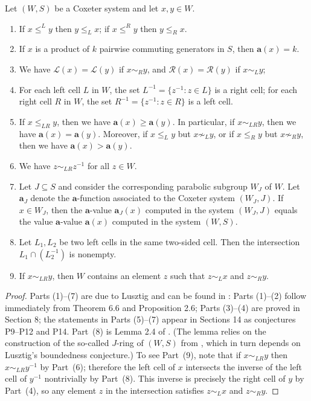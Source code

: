 \documentclass[ALCO,Unicode,published]{cedram}
\newcommand{\call}{\mathcal{L}}
\newcommand{\calr}{\mathcal{R}}
\newcommand{\la}{\mathbf{a}}
\newcommand{\se}{\subseteq}
\newcommand{\inverse}{^{-1}}
\begin{document}
\begin{prop}
     \label{prop:Facts}
     Let $(W,S)$ be a Coxeter system and let $x,y\in W$.
     \begin{enumerate}
         \item If $x\le^L y$ then $y\le_L x$; if $x\le^R y $ then $y\le_R x$.
         \item If $x$ is a product of $k$ pairwise commuting generators in $S$, then $\la(x)=k$.
         \item We have $\call(x)=\call(y)$ if $x\sim_R y$, and $\calr(x)=\calr(y)$ if $x\sim_L y$;
         \item For each left cell $L$ in $W$, the set $L\inverse=\{z\inverse: z\in L\}$ is a right cell; for each
             right cell $R$ in $W$, the set $R\inverse=\{z\inverse:z\in R\}$ is a left cell. 
         \item If $x\le_{LR} y$, then we have $\la(x)\ge \la(y)$. In particular, if $x\sim_{LR}y$, then
             we have $\la(x)=\la(y)$. Moreover, if $x\le_L y$ but $x\not\sim_L y$, or if $x\le_R y$ but
             $x\not\sim_R y$, then we have $\la(x)>\la(y)$.
         \item We have $z\sim_{LR} z\inverse$ for all $z\in W$.
         \item Let $J\se S$ and consider the corresponding parabolic subgroup $W_J$ of $W$.
             Let $\la_J$ denote the $\la$-function associated to the Coxeter system $(W_J,J)$. If 
             $x\in W_J$, then
             the $\la$-value $\la_J(x)$ computed in the system $(W_J, J)$ equals the value
             $\la$-value $\la(x)$ computed in the system $(W,S)$.
         \item Let $L_1,L_2$ be two left cells in the same two-sided
             cell. Then the intersection $L_1\cap (L_2\inverse)$ is
             nonempty.
         \item If $x\sim_{LR}y$, then $W$ contains an element $z$ such that $z\sim_L x$ and $z\sim_R y$. 
     \end{enumerate}
        \end{prop}
        \begin{proof}
Parts (1)--(7) are due to Lusztig and can be found in \cite{LusztigHecke}: Parts (1)--(2) follow
immediately from Theorem 6.6 and Proposition 2.6; Parts (3)--(4) are proved in Section 8; the
statements in Parts (5)--(7) appear in Sections 14 as conjectures P9--P12 and P14.  Part~(8) is
Lemma 2.4 of \cite{BO}. (The lemma relies on the construction of the so-called $J$-ring of $(W,S)$
from \cite[\S 18]{LusztigHecke}, which in turn depends on Lusztig's boundedness conjecture.)  To see
Part~(9), note that if $x\sim_{LR} y$ then $x\sim_{LR} y\inverse$ by Part~(6); therefore the left
cell of $x$ intersects the inverse of the left cell of $y\inverse$ nontrivially by Part~(8).  This
inverse is precisely the right cell of $y$ by Part~(4), so any element $z$ in the intersection
satisfies $z\sim_L x$ and $z\sim_R y$.  
    \end{proof}
\end{document}
